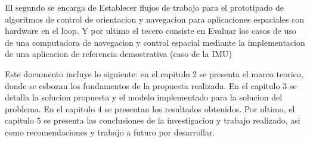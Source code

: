 El segundo se encarga de Establecer flujos de trabajo para el prototipado de algoritmos de control de orientacion
y navegacion para aplicaciones espaciales con hardware en el loop. Y por ultimo el tecero consiste en Evaluar los casos de uso de una computadora de navegacion y control espacial mediante
la implementacion de una aplicacion de referencia demostrativa (caso de la IMU)


Este documento incluye lo siguiente: en el capitulo 2 se presenta el marco teorico, donde se
esbozan los fundamentos de la propuesta realizada. En el capitulo 3 se detalla la solucion
propuesta y el modelo implementado para la solucion del problema. En el capitulo 4 se
presentan los resultados obtenidos. Por ultimo, el capitulo 5 se presenta las conclusiones
de la investigacion y trabajo realizado, asi como recomendaciones y trabajo a futuro por
desarrollar.

